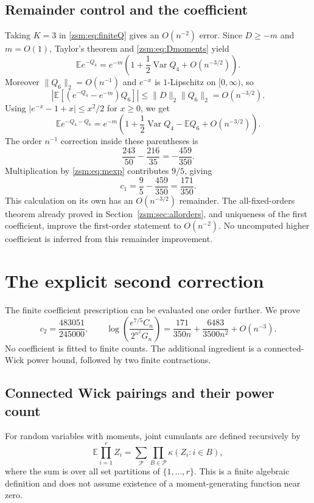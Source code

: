 \documentclass[11pt]{article}
\theoremstyle{definition}\newtheorem{definition}[theorem]{Definition}
\theoremstyle{remark}\newtheorem{remark}[theorem]{Remark}
\newcommand{\E}{\mathbb E}
\newcommand{\Var}{\operatorname{Var}}
\begin{document}
\subsection{Remainder control and the coefficient}
Taking $K=3$ in \eqref{zsm:eq:finiteQ} gives an $O(n^{-2})$ error. Since
$D\ge-m$ and $m=O(1)$, Taylor's theorem and \eqref{zsm:eq:Dmoments} yield
\[
 \E e^{-Q_4}=e^{-m}\left(1+\frac12\Var Q_4+O(n^{-3/2})\right).
\]
Moreover $\|Q_6\|_2=O(n^{-1})$ and $e^{-x}$ is $1$-Lipschitz on
$[0,\infty)$, so
\[
 \left|\E[(e^{-Q_4}-e^{-m})Q_6]\right|
 \le\|D\|_2\|Q_6\|_2=O(n^{-3/2}).
\]
Using $|e^{-x}-1+x|\le x^2/2$ for $x\ge0$, we get
\[
 \E e^{-Q_4-Q_6}
 =e^{-m}\left(1+\frac12\Var Q_4-\E Q_6+O(n^{-3/2})\right).
\]
The order $n^{-1}$ correction inside these parentheses is
\[
 \frac{243}{50}-\frac{216}{35}=-\frac{459}{350}.
\]
Multiplication by \eqref{zsm:eq:mexp} contributes $9/5$, giving
\[
 c_1=\frac95-\frac{459}{350}=\frac{171}{350}.
\]
This calculation on its own has an $O(n^{-3/2})$ remainder. The all-fixed-orders
theorem already proved in Section~\ref{zsm:sec:allorders}, and uniqueness of the
first coefficient, improve the first-order statement to $O(n^{-2})$. No
uncomputed higher coefficient is inferred from this remainder improvement.

\section{The explicit second correction}\label{zsm:sec:second}
The finite coefficient prescription can be evaluated one order further. We
prove
\begin{equation}\label{zsm:eq:c2}
 c_2=\frac{483051}{245000},\qquad
 \log\left(\frac{e^{7/5}C_n}{2^{n^2}G_n}\right)
 =\frac{171}{350n}+\frac{6483}{3500n^2}+O(n^{-3}).
\end{equation}
No coefficient is fitted to finite counts. The additional ingredient is a
connected-Wick power bound, followed by two finite contractions.

\subsection{Connected Wick pairings and their power count}
For random variables with moments, joint cumulants are defined recursively by
\[
 \E\prod_{i=1}^r Z_i=
 \sum_{\mathcal P}\prod_{B\in\mathcal P}\kappa(Z_i:i\in B),
\]
where the sum is over all set partitions of $\{1,\ldots,r\}$. This is a finite
algebraic definition and does not assume existence of a moment-generating
function near zero.
\end{document}
